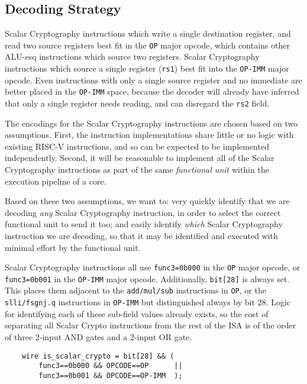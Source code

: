\subsection{Decoding Strategy}

Scalar Cryptography instructions which write a single
destination register, and read two source registers
best fit in the {\tt OP} major opcode, which contains other ALU-esq
instructions which source two registers.
Scalar Cryptography instructions which source a single register ({\tt rs1})
best fit into the {\tt OP-IMM} major opcode.
Even instructions with only a single source register and no immediate are
better placed in the {\tt OP-IMM} space, because the decoder will already
have inferred that only a single register needs reading, and can disregard
the {\tt rs2} field.

The encodings for the Scalar Cryptography instructions are chosen based on
two assumptions.
First, the instruction implementations share little or no logic with existing
RISC-V instructions, and so can be expected to be implemented
independently.
Second, it will be reasonable to implement all of the Scalar Cryptography
instructions as part of the same {\em functional unit} within the
execution pipeline of a core.

Based on these two assumptions, we want to:
very quickly identify
that we are decoding {\em any} Scalar Cryptography instruction, in order to
select the correct functional unit to send it too; and
easily identify {\em which} Scalar Cryptography instruction we are decoding,
so that it may be identified and executed with minimal effort by the
functional unit.

Scalar Cryptography instructions all use {\tt func3=0b000} in the {\tt OP}
major opcode, or {\tt func3=0b001} in the {\tt OP-IMM} major opcode.
Additionally, {\tt bit[28]} is always set.
This places them adjacent to the {\tt add/mul/sub} instructions in {\tt OP},
or the {\tt slli/fsgnj.q} instructions in {\tt OP-IMM} 
but distinguished always by bit $28$.
Logic for identifying each of these sub-field values already exists, so
the cost of separating all Scalar Crypto instructions from the rest of the
ISA is of the order of three 2-input AND gates and a 2-input OR gate.

\begin{verbatim}
    wire is_scalar_crypto = bit[28] && (
        func3==0b000 && OPCODE==OP      ||
        func3==0b001 && OPCODE==OP-IMM  );
\end{verbatim}

